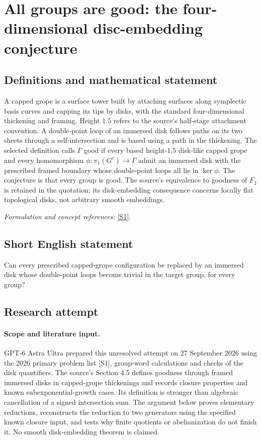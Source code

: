 \documentclass[11pt]{article}
\begin{document}
\section*{\texorpdfstring{All groups are good: the four-dimensional disc-embedding conjecture}{All groups are good: the four-dimensional disc-embedding conjecture}}\label{30006816}
\subsection{Definitions and mathematical statement}
A capped grope is a surface tower built by attaching surfaces along symplectic basis curves and capping its tips by disks, with the standard four-dimensional thickening and framing. Height $1.5$ refers to the source's half-stage attachment convention. A double-point loop of an immersed disk follows paths on its two sheets through a self-intersection and is based using a path in the thickening. The selected definition calls $\Gamma$ good if every based height-$1.5$ disk-like capped grope and every homomorphism
$\phi:\pi_1(G^c)\to\Gamma$ admit an immersed disk with the prescribed framed boundary whose double-point loops all lie in $\ker\phi$. The conjecture is that every group is good. The source's equivalence to goodness of $F_2$ is retained in the quotation; its disk-embedding consequence concerns locally flat topological disks, not arbitrary smooth embeddings.
\par\smallskip\textit{Formulation and concept references:} \href{https://bpb-us-e2.wpmucdn.com/websites.umass.edu/dist/b/22144/files/2026/04/K3-problem-list-watermarked.pdf}{[S1]}.

\subsection{Short English statement}
Can every prescribed capped-grope configuration be replaced by an immersed disk whose double-point loops become trivial in the target group, for every group?
\subsection{Research attempt}
\paragraph{Scope and literature input.}
GPT-6 Astra Ultra prepared this unresolved attempt on 27 September 2026
using the 2026 primary problem list [S1], group-word calculations and
checks of the disk quantifiers. The source's Section 4.5 defines goodness
through framed immersed disks in capped-grope thickenings and records
closure properties and known subexponential-growth cases. Its definition
is stronger than algebraic cancellation of a signed intersection sum.
The argument below proves elementary reductions, reconstructs the
reduction to two generators using the specified known closure input,
and tests why finite quotients or abelianization do not finish it.
No smooth disk-embedding theorem is claimed.
\end{document}
